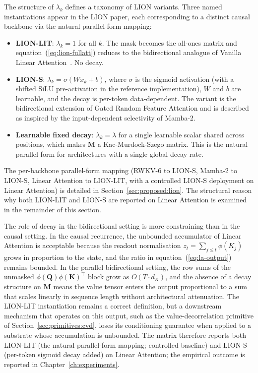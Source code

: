 The structure of $\lambda_{k}$ defines a taxonomy of LION variants.
Three named instantiations appear in the LION paper, each
corresponding to a distinct causal backbone via the natural
parallel-form mapping:
\begin{itemize}
    \item \textbf{LION-LIT}: $\lambda_{k} = 1$ for all $k$. The mask
      becomes the all-ones matrix and
      equation~(\ref{eq:lion-fullatt}) reduces to the bidirectional
      analogue of Vanilla Linear
      Attention~\cite{katharopoulos2020transformers}. No decay.
    \item \textbf{LION-S}: $\lambda_{k} = \sigma(W x_{k} + b)$, where
      $\sigma$ is the sigmoid activation (with a shifted SiLU
      pre-activation in the reference implementation), $W$ and $b$
      are learnable, and the decay is per-token data-dependent.
      The variant is the bidirectional extension of Gated Random
      Feature Attention and is described as inspired by the
      input-dependent selectivity of Mamba-2.
    \item \textbf{Learnable fixed decay}: $\lambda_{k} = \lambda$
      for a single learnable scalar shared across positions, which
      makes $\mathbf{M}$ a Kac-Murdock-Szego matrix. This is the
      natural parallel form for architectures with a single global
      decay rate.
\end{itemize}

The per-backbone parallel-form mapping (RWKV-6 to LION-S,
Mamba-2 to LION-S, Linear Attention to LION-LIT, with a
controlled LION-S deployment on Linear Attention) is detailed
in Section~\ref{sec:proposed:lion}. The structural reason why
both LION-LIT and LION-S are reported on Linear Attention is
examined in the remainder of this section.

The role of decay in the bidirectional setting is more constraining
than in the causal setting. In the causal recurrence, the unbounded
accumulator of Linear Attention is acceptable because the readout
normalisation $z_{t} = \sum_{j \le t} \phi(K_{j})$ grows in proportion
to the state, and the ratio in equation~(\ref{eq:la-output}) remains
bounded. In the parallel bidirectional setting, the row sums of the
unmasked $\phi(\mathbf{Q}) \phi(\mathbf{K})^{\top}$ block grow as
$O(T \cdot d_{K})$, and the absence of a decay structure on
$\mathbf{M}$ means the value tensor enters the output proportional to
a sum that scales linearly in sequence length without architectural
attenuation. The LION-LIT instantiation remains a correct definition,
but a downstream mechanism that operates on this output, such
as the value-decorrelation primitive of
Section~\ref{sec:primitives:cvd}, loses its conditioning
guarantee when applied to a substrate whose accumulation is
unbounded. The matrix therefore reports both LION-LIT (the
natural parallel-form mapping; controlled baseline) and LION-S
(per-token sigmoid decay added) on Linear Attention; the
empirical outcome is reported in Chapter~\ref{ch:experiments}.

